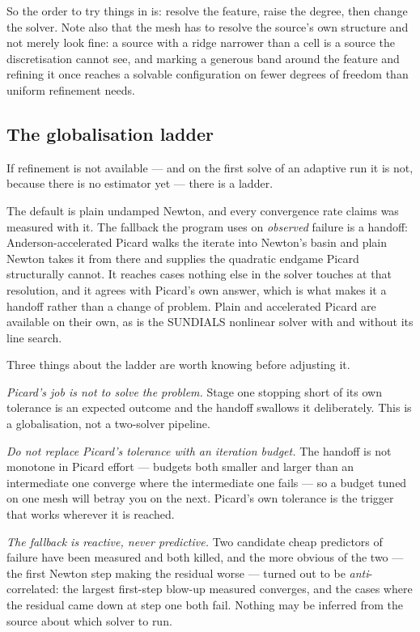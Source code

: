 So the order to try things in is: resolve the feature, raise the degree, then
change the solver. Note also that the mesh has to resolve the source's own
structure and not merely look fine: a source with a ridge narrower than a cell
is a source the discretisation cannot see, and marking a generous band around
the feature and refining it once reaches a solvable configuration on fewer
degrees of freedom than uniform refinement needs.

\subsection{The globalisation ladder}

If refinement is not available --- and on the first solve of an adaptive run it
is not, because there is no estimator yet --- there is a ladder.

The default is plain undamped Newton, and every convergence rate {\meq} claims
was measured with it. The fallback the program uses on \emph{observed} failure
is a handoff: Anderson-accelerated Picard walks the iterate into Newton's basin
and plain Newton takes it from there and supplies the quadratic endgame Picard
structurally cannot. It reaches cases nothing else in the solver touches at that
resolution, and it agrees with Picard's own answer, which is what makes it a
handoff rather than a change of problem. Plain and accelerated Picard are
available on their own, as is the SUNDIALS nonlinear solver with and without its
line search.

Three things about the ladder are worth knowing before adjusting it.

\emph{Picard's job is not to solve the problem.} Stage one stopping short of its
own tolerance is an expected outcome and the handoff swallows it deliberately.
This is a globalisation, not a two-solver pipeline.

\emph{Do not replace Picard's tolerance with an iteration budget.} The handoff
is not monotone in Picard effort --- budgets both smaller and larger than an
intermediate one converge where the intermediate one fails --- so a budget tuned
on one mesh will betray you on the next. Picard's own tolerance is the trigger
that works wherever it is reached.

\emph{The fallback is reactive, never predictive.} Two candidate cheap
predictors of failure have been measured and both killed, and the more obvious
of the two --- the first Newton step making the residual worse --- turned out to
be \emph{anti}-correlated: the largest first-step blow-up measured converges,
and the cases where the residual came down at step one both fail. Nothing may be
inferred from the source about which solver to run.

